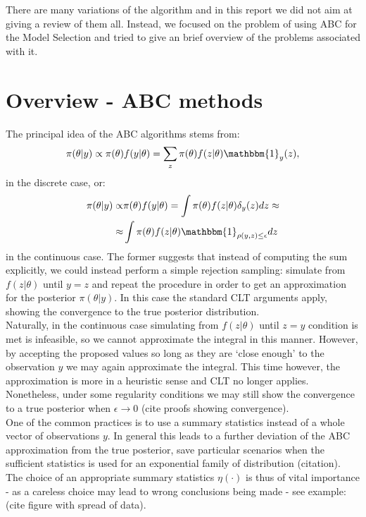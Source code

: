 \documentclass[fleqn,10pt]{SelfArx} %
\begin{document}
There are many variations of the algorithm and in this report we did not aim at giving a review of them all. Instead, we focused on the problem of using ABC for the Model Selection and tried to give an brief overview of the problems associated with it.


\section{Overview - ABC methods}
The principal idea of the ABC algorithms stems from:
\begin{equation}
\pi(\theta|y)\propto \pi(\theta)f(y|\theta) = \sum_z\pi(\theta)f(z|\theta)\mathbbm{1}_y(z),
\end{equation}
in the discrete case, or:
\begin{equation}\label{eq:abc_cts}
\begin{split}
\pi(\theta|y)\propto& \pi(\theta)f(y|\theta) = \int\pi(\theta)f(z|\theta)\delta_y(z)dz\approx\\
\approx&\int\pi(\theta)f(z|\theta)\mathbbm{1}_{\rho(y,z)\leq \epsilon}dz
\end{split}
\end{equation}
in the continuous case. The former suggests that instead of computing the sum explicitly, we could instead perform a simple rejection sampling: simulate from $f(z|\theta)$ until $y=z$ and repeat the procedure in order to get an approximation for the posterior $\pi(\theta|y)$. In this case the standard CLT arguments apply, showing the convergence to the true posterior distribution.\\

 Naturally, in the continuous case simulating from $f(z|\theta)$ until $z = y$ condition is met is infeasible, so we cannot approximate the integral in this manner. However, by accepting the proposed values so long as they are `close enough' to the observation $y$ we may again approximate the integral. This time however, the approximation is more in a heuristic sense and CLT no longer applies. Nonetheless, under some regularity conditions we may still show the convergence to a true posterior when $\epsilon\rightarrow 0$ (cite proofs showing convergence).\\
 
One of the common practices is to use a summary statistics instead of a whole vector of observations $y$. In general this leads to a further deviation of the ABC approximation from the true posterior, save particular scenarios when the sufficient statistics is used for an exponential family of distribution (citation). The choice of an appropriate summary statistics $\eta(\cdot)$ is thus of vital importance - as a careless choice may lead to wrong conclusions being made - see example: (cite figure with spread of data).\\
\end{document}
